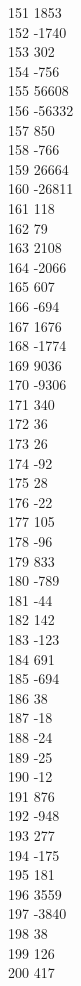 { 151	1853 \\
 152	-1740 \\
 153	302 \\
 154	-756 \\
 155	56608 \\
 156	-56332 \\
 157	850 \\
 158	-766 \\
 159	26664 \\
 160	-26811 \\
 161	118 \\
 162	79 \\
 163	2108 \\
 164	-2066 \\
 165	607 \\
 166	-694 \\
 167	1676 \\
 168	-1774 \\
 169	9036 \\
 170	-9306 \\
 171	340 \\
 172	36 \\
 173	26 \\
 174	-92 \\
 175	28 \\
 176	-22 \\
 177	105 \\
 178	-96 \\
 179	833 \\
 180	-789 \\
 181	-44 \\
 182	142 \\
 183	-123 \\
 184	691 \\
 185	-694 \\
 186	38 \\
 187	-18 \\
 188	-24 \\
 189	-25 \\
 190	-12 \\
 191	876 \\
 192	-948 \\
 193	277 \\
 194	-175 \\
 195	181 \\
 196	3559 \\
 197	-3840 \\
 198	38 \\
 199	126 \\
 200	417 \\
}
